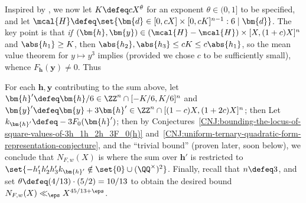 \documentclass[12pt]{report}
\begin{document}
{Inspired by \cite{marmon2019hasse},
we now let $K\defeq cX^\theta$ for an exponent $\theta\in(0,1]$ to be specified,
and let $\mcal{H}\defeq\set{\bm{d}\in[0,cX]\times[0,cK]^{n-1}:6\mid\bm{d}}$.
The key point is that \emph{if}
$(\bm{h},\bm{y})\in(\mcal{H}-\mcal{H})\times[X,(1+c)X]^n$
and $\abs{h_1}\geq K$,
then $\abs{h_2},\abs{h_3}\leq cK\leq c\abs{h_1}$,
so the mean value theorem for $y\mapsto y^3$ implies
(provided we chose $c$ to be sufficiently small),
whence $F_{\bm{h}}(\bm{y})\neq0$.
Thus

For each $\bm{h},\bm{y}$ contributing to the sum above,
let $\bm{h}'\defeq\bm{h}/6\in\ZZ^n\cap[-K/6,K/6]^n$
and $\bm{y}'\defeq\bm{y}+3\bm{h}'\in\ZZ^n\cap[(1-c)X,(1+2c)X]^n$;
then
Let $k_{\bm{h}'}\defeq -3F_0(\bm{h}')$;
then by Conjectures~\ref{CNJ:bounding-the-locus-of-square-values-of-3h_1h_2h_3F_0(h)} and~\ref{CNJ:uniform-ternary-quadratic-form-representation-conjecture},
and the ``trivial bound''
(proven later, soon below),
we conclude that $N_{F,w}(X)$ is
where the sum over $\bm{h}'$ is restricted to $\set{-h'_1h'_2h'_3k_{\bm{h}'}\notin\set{0}\cup(\QQ^\times)^2}$.
Finally,
recall that $n\defeq3$,
and set $\theta\defeq(4/13)\cdot(5/2)=10/13$ to obtain the desired bound $N_{F,w}(X)\ll_\eps X^{45/13+\eps}$.
}
\end{document}
